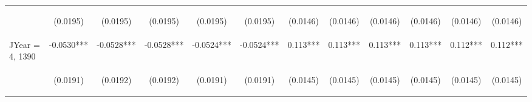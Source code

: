 \documentclass[]{article}
\begin{document}
\begin{center}
\begin{tabular}{lccccccccccc}
\vspace{4pt} & \begin{footnotesize}(0.0195)\end{footnotesize} & \begin{footnotesize}(0.0195)\end{footnotesize} & \begin{footnotesize}(0.0195)\end{footnotesize} & \begin{footnotesize}(0.0195)\end{footnotesize} & \begin{footnotesize}(0.0195)\end{footnotesize} & \begin{footnotesize}(0.0146)\end{footnotesize} & \begin{footnotesize}(0.0146)\end{footnotesize} & \begin{footnotesize}(0.0146)\end{footnotesize} & \begin{footnotesize}(0.0146)\end{footnotesize} & \begin{footnotesize}(0.0146)\end{footnotesize} & \begin{footnotesize}(0.0146)\end{footnotesize} \\
JYear = 4, 1390 & -0.0530*** & -0.0528*** & -0.0528*** & -0.0524*** & -0.0524*** & 0.113*** & 0.113*** & 0.113*** & 0.113*** & 0.112*** & 0.112*** \\
\vspace{4pt} & \begin{footnotesize}(0.0191)\end{footnotesize} & \begin{footnotesize}(0.0192)\end{footnotesize} & \begin{footnotesize}(0.0192)\end{footnotesize} & \begin{footnotesize}(0.0191)\end{footnotesize} & \begin{footnotesize}(0.0191)\end{footnotesize} & \begin{footnotesize}(0.0145)\end{footnotesize} & \begin{footnotesize}(0.0145)\end{footnotesize} & \begin{footnotesize}(0.0145)\end{footnotesize} & \begin{footnotesize}(0.0145)\end{footnotesize} & \begin{footnotesize}(0.0145)\end{footnotesize} & \begin{footnotesize}(0.0145)\end{footnotesize} \\

\end{tabular}
\end{center}
\end{document}
